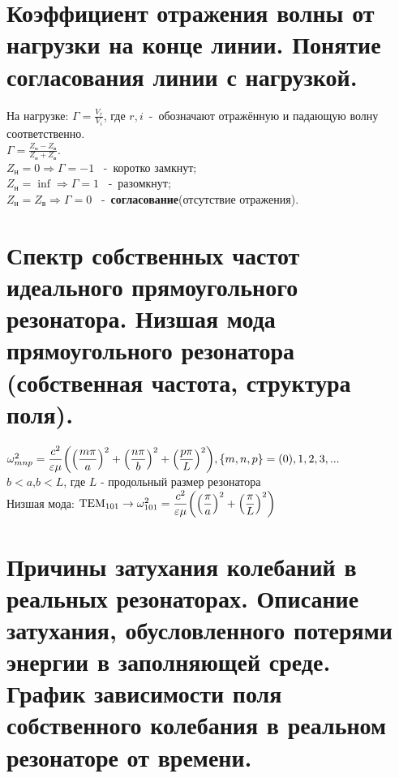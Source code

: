 \begin{multicols*}{2}
		\section{Коэффициент отражения волны от нагрузки на конце линии. Понятие согласования линии с нагрузкой.}
		
		На нагрузке: $\Gamma=\frac {V_r}{V_i}$, где $r, i$~-~обозначают отражённую и падающую волну соответственно. \\
		$\Gamma=\frac{Z_\text{н}-Z_\text{в}}{Z_\text{н}+Z_\text{в}}$. \\
		$Z_\text{н}=0 \Rightarrow \Gamma=-1$ ~-~коротко замкнут; \\
		$Z_\text{н}=\inf \Rightarrow \Gamma=1$ ~-~разомкнут; \\
		$Z_\text{н}=Z_\text{в} \Rightarrow \Gamma=0$ ~-~\textbf{согласование}(отсутствие отражения).
		
		\section{Спектр собственных частот идеального прямоугольного резонатора. Низшая мода прямоугольного резонатора (собственная частота, структура поля).}

		$\omega_{mnp}^2=\dfrac{c^2}{\varepsilon\mu}\qty(\qty(\dfrac{m\pi}{a})^2+\qty(\dfrac{n\pi}{b})^2+\qty(\dfrac{p\pi}{L})^2), \{m,n,p\} = (0),1,2,3,...$ \\
		$b < a$,\quad $b < L$, где $L$ - продольный размер резонатора\\
		Низшая мода: ${\text{TEM}}_{101} \rightarrow \omega_{101}^2 = \dfrac{c^2}{\varepsilon\mu}\qty(\qty(\dfrac{\pi}{a})^2+\qty(\dfrac{\pi}{L})^2)$
		
		\section{Причины затухания колебаний в реальных резонаторах. Описание затухания, обусловленного потерями энергии в заполняющей среде. График зависимости поля собственного колебания в реальном резонаторе от времени.}


\end{multicols*}
